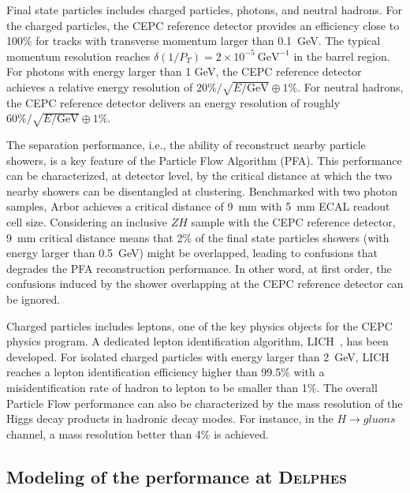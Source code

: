\documentclass[a4paper,10pt,twoside]{cpc-hepnp}
\begin{document}
\begin{multicols}{2}
Final state particles includes charged particles, photons, and neutral hadrons. 
For the charged particles, the CEPC reference detector provides an efficiency close to 100\% for tracks with transverse momentum larger than 0.1~GeV. 
The typical momentum resolution reaches $\delta(1/P_{T}) = 2\times10^{-5}~\mbox{GeV}^{-1}$ in the barrel region. 
For photons with energy larger than 1 GeV, the CEPC reference detector achieves a relative energy resolution of $20\%/\sqrt{E/\mbox{GeV}} \oplus 1\%$.
For neutral hadrons, the CEPC reference detector delivers an energy resolution of roughly $60\%/\sqrt{E/\mbox{GeV}} \oplus 1\%$.  
 
The separation performance, i.e., the ability of reconstruct nearby particle showers, is a key feature of the Particle Flow Algorithm (PFA). 
This performance can be characterized, at detector level, by the critical distance at which the two nearby showers can be disentangled at clustering. 
Benchmarked with two photon samples, Arbor achieves a critical distance of 9~mm with 5~mm ECAL readout cell size. 
Considering an inclusive $ZH$ sample with the CEPC reference detector, 9~mm critical distance means that 2\% of the final state particles showers (with energy larger than 0.5~GeV) might be overlapped, leading to confusions that degrades the PFA reconstruction performance. 
In other word, at first order, the confusions induced by the shower overlapping at the CEPC reference detector can be ignored. 

Charged particles includes leptons, one of the key physics objects for the CEPC physics program. 
A dedicated lepton identification algorithm, LICH~\cite{ref:LICH}, has been developed. 
For isolated charged particles with energy larger than 2~GeV, LICH reaches a lepton identification efficiency higher than 99.5\% with a misidentification rate of hadron to lepton to be smaller than 1\%.   
The overall Particle Flow performance can also be characterized by the mass resolution of the Higgs decay products in hadronic decay modes. 
For instance, in the $H\to gluons$ channel, a mass resolution better than 4\% is achieved. 

\subsection{Modeling of the performance at {\textsc{Delphes}}}


\end{multicols}
\end{document}
